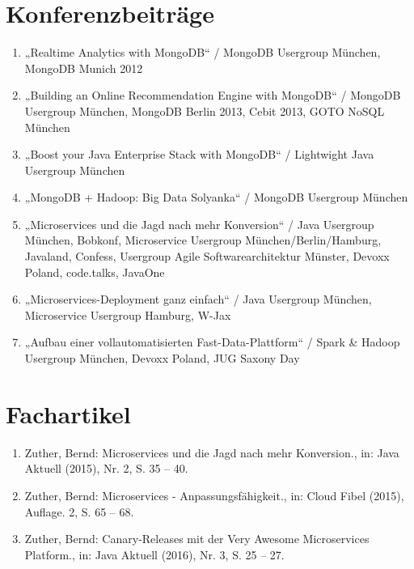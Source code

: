 \section*{Konferenzbeiträge}
\begin{enumerate}[label=,leftmargin=0cm,itemsep=10pt]
\item „Realtime Analytics with MongoDB“ / MongoDB Usergroup München, MongoDB Munich 2012
\item „Building an Online Recommendation Engine with MongoDB“ / MongoDB Usergroup München, MongoDB Berlin 2013, Cebit 2013, GOTO NoSQL München
\item „Boost your Java Enterprise Stack with MongoDB“ / Lightwight Java Usergroup München
\item „MongoDB + Hadoop: Big Data Solyanka“ / MongoDB Usergroup München
\item „Microservices und die Jagd nach mehr Konversion“ / Java Usergroup München, Bobkonf, Microservice  Usergroup München/Berlin/Hamburg, Javaland, Confess, Usergroup Agile Softwarearchitektur Münster, Devoxx Poland, code.talks, JavaOne
\item „Microservices-Deployment ganz einfach“ / Java Usergroup München, Microservice  Usergroup Hamburg, W-Jax
\item „Aufbau einer vollautomatisierten Fast-Data-Plattform“ / Spark \& Hadoop Usergroup München, Devoxx Poland, JUG Saxony Day
\end{enumerate}

\section*{Fachartikel}
\begin{enumerate}[label=,leftmargin=0cm,itemsep=10pt]
\item Zuther, Bernd: Microservices und die Jagd nach mehr Konversion., in: Java Aktuell (2015), Nr. 2, S. 35 – 40.
\item Zuther, Bernd: Microservices - Anpassungsfähigkeit., in: Cloud Fibel (2015), Auflage. 2, S. 65 – 68.
\item Zuther, Bernd: Canary-Releases mit der Very Awesome Microservices Platform., in: Java Aktuell (2016), Nr. 3, S. 25 – 27.
\end{enumerate}